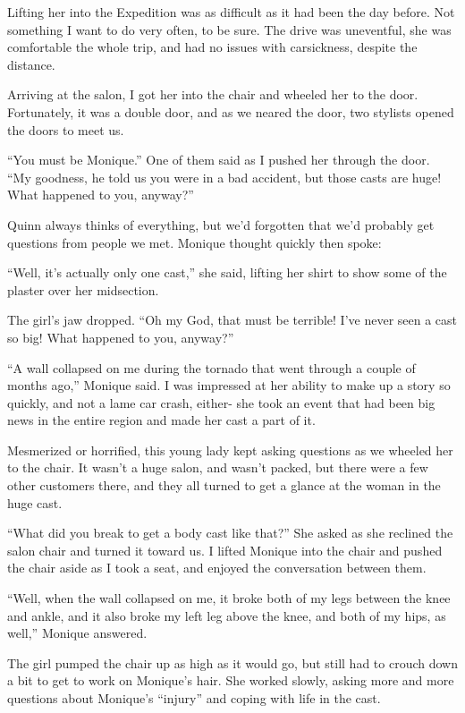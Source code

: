 Lifting her into the Expedition was as difficult as it had been the day before. Not
something I want to do very often, to be sure. The drive was uneventful, she was comfortable the
whole trip, and had no issues with carsickness, despite the distance.

Arriving at the salon, I got her into the chair and wheeled her to the door. Fortunately,
it was a double door, and as we neared the door, two stylists opened the doors to meet us.

``You must be Monique.'' One of them said as I pushed her through the door. ``My goodness, he
told us you were in a bad accident, but those casts are huge! What happened to you, anyway?''

\begin{thought}
Quinn always thinks of everything, but we'd forgotten that we'd probably get questions from
people we met. Monique thought quickly then spoke:
\end{thought}

``Well, it's actually only one cast,'' she said, lifting her shirt to show some of the
plaster over her midsection.

The girl's jaw dropped. ``Oh my God, that must be terrible! I've never seen a cast so big!
What happened to you, anyway?''

``A wall collapsed on me during the tornado that went through a couple of months ago,''
Monique said. I was impressed at her ability to make up a story so quickly, and not a lame car
crash, either- she took an event that had been big news in the entire region and made her cast a
part of it.

Mesmerized or horrified, this young lady kept asking questions as we wheeled her to the
chair. It wasn't a huge salon, and wasn't packed, but there were a few other customers there,
and they all turned to get a glance at the woman in the huge cast.

``What did you break to get a body cast like that?'' She asked as she reclined the salon
chair and turned it toward us. I lifted Monique into the chair and pushed the chair aside as I
took a seat, and enjoyed the conversation between them.

``Well, when the wall collapsed on me, it broke both of my legs between the knee and ankle,
and it also broke my left leg above the knee, and both of my hips, as well,'' Monique answered.

The girl pumped the chair up as high as it would go, but still had to crouch down a bit to
get to work on Monique's hair. She worked slowly, asking more and more questions about Monique's
``injury'' and coping with life in the cast.


